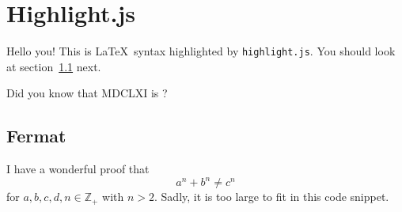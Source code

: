 \documentclass{article}
\newcommand\hi[1]{Hello #1!}
\begin{document}
\section{Highlight.js}
\hi{you}
This is \LaTeX\ syntax highlighted by \verb|highlight.js|.
You should look at section~\ref{sec:fermat} next.

Did you know that MDCLXI is ? %

\subsection{Fermat}\label{sec:fermat}
I have a wonderful proof that
\[
  a^n + b^n \neq c^n
\]
for \(a, b, c, d, n \in \mathbb{Z}_+\) with \(n > 2\).
Sadly, it is too large to fit in this code snippet.
\end{document}
